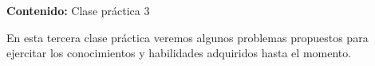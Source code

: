 {\Large
    \textbf{Contenido:} Clase práctica 3
}

En esta tercera clase práctica veremos algunos problemas propuestos para ejercitar los conocimientos y habilidades adquiridos hasta el momento.